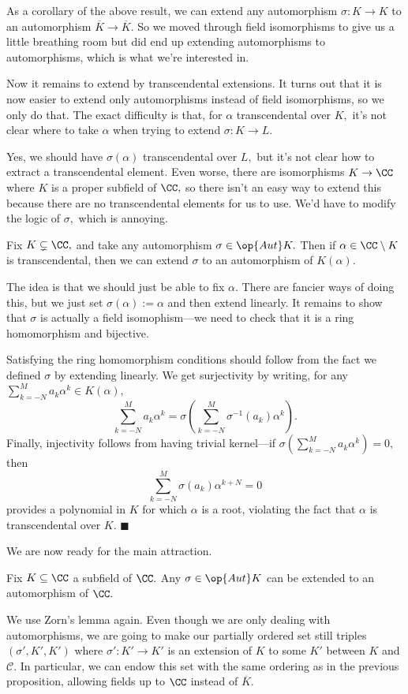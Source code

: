 As a corollary of the above result, we can extend any automorphism $\sigma:K\to K$ to an automorphism $\overline K\to\overline K.$ So we moved through field isomorphisms to give us a little breathing room but did end up extending automorphisms to automorphisms, which is what we're interested in.

Now it remains to extend by transcendental extensions. It turns out that it is now easier to extend only automorphisms instead of field isomorphisms, so we only do that. The exact difficulty is that, for $\alpha$ transcendental over $K,$ it's not clear where to take $\alpha$ when trying to extend $\sigma:K\to L.$

Yes, we should have $\sigma(\alpha)$ transcendental over $L,$ but it's not clear how to extract a transcendental element. Even worse, there are isomorphisms $K\to\CC$ where $K$ is a proper subfield of $\CC,$ so there isn't an easy way to extend this because there are no transcendental elements for us to use. We'd have to modify the logic of $\sigma,$ which is annoying.
\begin{lemma}
    Fix $K\subsetneq\CC,$ and take any automorphism $\sigma\in\op{Aut}K.$ Then if $\alpha\in\CC\setminus K$ is transcendental, then we can extend $\sigma$ to an automorphism of $K(\alpha).$
\end{lemma}
The idea is that we should just be able to fix $\alpha.$ There are fancier ways of doing this, but we just set $\sigma(\alpha):=\alpha$ and then extend linearly. It remains to show that $\sigma$ is actually a field isomophism---we need to check that it is a ring homomorphism and bijective.
    
Satisfying the ring homomorphism conditions should follow from the fact we defined $\sigma$ by extending linearly. We get surjectivity by writing, for any $\sum_{k=-N}^Ma_k\alpha^k\in K(\alpha),$
\[\sum_{k=-N}^Ma_k\alpha^k=\sigma\left(\sum_{k=-N}^M\sigma^{-1}(a_k)\alpha^k\right).\]
Finally, injectivity follows from having trivial kernel---if $\sigma\left(\sum_{k=-N}^Ma_k\alpha^k\right)=0,$ then
\[\sum_{k=-N}^M\sigma(a_k)\alpha^{k+N}=0\]
provides a polynomial in $K$ for which $\alpha$ is a root, violating the fact that $\alpha$ is transcendental over $K.$ $\blacksquare$

We are now ready for the main attraction.
\begin{theorem}
    Fix $K\subseteq\CC$ a subfield of $\CC.$ Any $\sigma\in\op{Aut}K$ can be extended to an automorphism of $\CC.$
\end{theorem}
We use Zorn's lemma again. Even though we are only dealing with automorphisms, we are going to make our partially ordered set still triples $(\sigma',K',K')$ where $\sigma':K'\to K'$ is an extension of $K$ to some $K'$ between $K$ and $\mathcal C.$ In particular, we can endow this set with the same ordering as in the previous proposition, allowing fields up to $\CC$ instead of $\overline K.$

